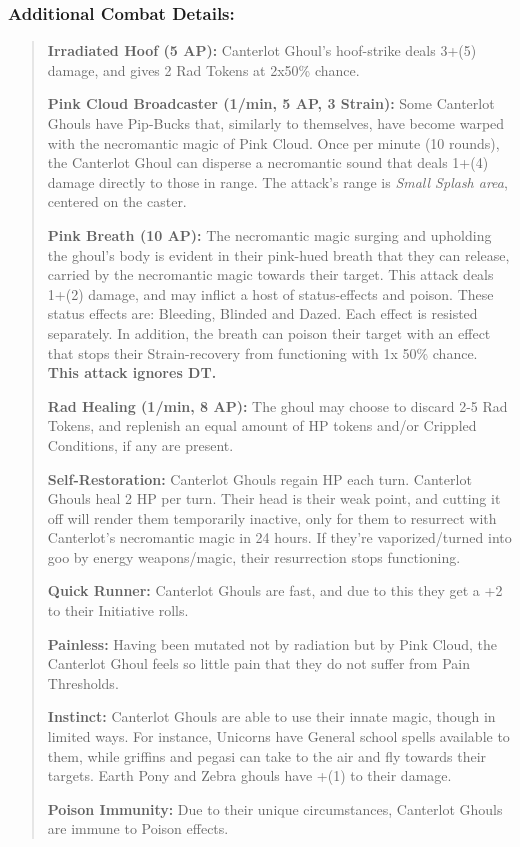 \documentclass[11pt,a4paper,twocolumn]{book}
\begin{document}
\subsubsection*{Additional Combat Details:}
\begin{verse}
	\textbf{Irradiated Hoof (5 AP):} Canterlot Ghoul's hoof-strike deals 3+(5) damage, and gives 2 Rad Tokens at 2x50\% chance.
	
	\textbf{Pink Cloud Broadcaster (1/min, 5 AP, 3 Strain):} Some Canterlot Ghouls have Pip-Bucks that, similarly to themselves, have become warped with the necromantic magic of Pink Cloud. Once per minute (10 rounds), the Canterlot Ghoul can disperse a necromantic sound that deals 1+(4) damage directly to those in range. The attack's range is \textit{Small Splash area}, centered on the caster.
	
	\textbf{Pink Breath (10 AP):} The necromantic magic surging and upholding the ghoul's body is evident in their pink-hued breath that they can release, carried by the necromantic magic towards their target. This attack deals 1+(2) damage, and may inflict a host of status-effects and poison. These status effects are: Bleeding, Blinded and Dazed. Each effect is resisted separately. In addition, the breath can poison their target with an effect that stops their Strain-recovery from functioning with 1x 50\% chance. \textbf{This attack ignores DT.}
	
	\textbf{Rad Healing (1/min, 8 AP):} The ghoul may choose to discard 2-5 Rad Tokens, and replenish an equal amount of HP tokens and/or Crippled Conditions, if any are present.
	
	\textbf{Self-Restoration:} Canterlot Ghouls regain HP each turn. Canterlot Ghouls heal 2 HP per turn. Their head is their weak point, and cutting it off will render them temporarily inactive, only for them to resurrect with Canterlot's necromantic magic in 24 hours. If they're vaporized/turned into goo by energy weapons/magic, their resurrection stops functioning.
	
	\textbf{Quick Runner:} Canterlot Ghouls are fast, and due to this they get a +2 to their Initiative rolls.
	
	\textbf{Painless:} Having been mutated not by radiation but by Pink Cloud, the Canterlot Ghoul feels so little pain that they do not suffer from Pain Thresholds.
	
	\textbf{Instinct:} Canterlot Ghouls are able to use their innate magic, though in limited ways. For instance, Unicorns have General school spells available to them, while griffins and pegasi can take to the air and fly towards their targets. Earth Pony and Zebra ghouls have +(1) to their damage. 
	
	\textbf{Poison Immunity:} Due to their unique circumstances, Canterlot Ghouls are immune to Poison effects.
\end{verse}
\end{document}
